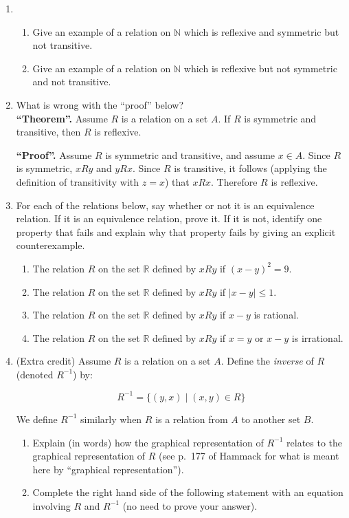 \documentclass{amsart}
\theoremstyle{definition}
\begin{document}
\begin{enumerate}
\item \begin{enumerate}
\item Give an example of a relation on $\mathbb{N}$ which is reflexive and symmetric but not transitive.
\item Give an example of a relation on $\mathbb{N}$ which is reflexive but not symmetric and not transitive.
\end{enumerate}
\item What is wrong with the ``proof'' below? \\
  \textbf{``Theorem''.} Assume $R$ is a relation on a set $A$. If $R$ is symmetric and transitive, then $R$ is reflexive. 

  \textbf{``Proof''.} Assume $R$ is symmetric and transitive, and assume $x \in A$. Since $R$ is symmetric, $xRy$ and $y R x$. Since $R$ is transitive, it follows (applying the definition of transitivity with $z = x$) that $x R x$. Therefore $R$ is reflexive.
\item For each of the relations below, say whether or not it is an equivalence relation. If it is an equivalence relation, prove it. If it is not, identify one property that fails and explain why that property fails by giving an explicit counterexample.

  \begin{enumerate}
  \item The relation $R$ on the set $\mathbb{R}$ defined by $x R y$ if $(x - y)^2 = 9$.
  \item The relation $R$ on the set $\mathbb{R}$ defined by $x R y$ if $|x - y| \le 1$.
  \item The relation $R$ on the set $\mathbb{R}$ defined by $x R y$ if $x - y$ is rational.
  \item The relation $R$ on the set $\mathbb{R}$ defined by $x R y$ if $x = y$ or $x - y$ is irrational.
  \end{enumerate}
  \item (Extra credit)
  Assume $R$ is a relation on a set $A$. Define the \emph{inverse} of $R$ (denoted $R^{-1}$) by:

  $$
  R^{-1} = \{(y, x) \mid (x, y) \in R\}
  $$

  We define $R^{-1}$ similarly when $R$ is a relation from $A$ to another set $B$.

  \begin{enumerate}
  \item Explain (in words) how the graphical representation of $R^{-1}$ relates to the graphical representation of $R$ (see p.~177 of Hammack for what is meant here by ``graphical representation'').
  \item Complete the right hand side of the following statement with an equation involving $R$ and $R^{-1}$ (no need to prove your answer). \\


\end{enumerate}
\end{enumerate}
\end{document}
